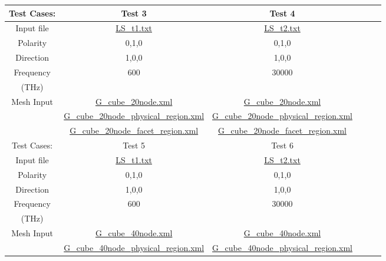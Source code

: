 \documentclass[12pt, titlepage]{article}
\begin{document}
\begin{enumerate}
\begin{table}[h!]
\begin{tabular}{|c|c|c|c|c|c|}
		Test Cases: & Test 3 & Test 4 \\
		\hline 
		Input file & \href{https://github.com/shmouses/SPDFM/tree/master/src/Input/LS_t1.txt}{LS\_t1.txt} & \href{https://github.com/shmouses/SPDFM/tree/master/src/LS_t2.txt}{LS\_t2.txt} \\
		Polarity  & 0,1,0 & 0,1,0 \\
		Direction & 1,0,0 & 1,0,0 \\
		Frequency &   600 & 30000 \\
		(THz) & & \\ \hline
		Mesh Input & \href{https://github.com/shmouses/SPDFM/tree/master/src/Mesh/G_cube_20node.xml}{G\_cube\_20node.xml} & \href{https://github.com/shmouses/SPDFM/tree/master/src/Mesh/G_cube_20node.xml}{G\_cube\_20node.xml} \\
		
		& \href{https://github.com/shmouses/SPDFM/tree/master/src/Mesh/G_cube_20node_physical_region.xml}{G\_cube\_20node\_physical\_region.xml} &
		\href{https://github.com/shmouses/SPDFM/tree/master/src/Mesh/G_cube_20node_physical_region.xml}{G\_cube\_20node\_physical\_region.xml} \\
		
		& \href{https://github.com/shmouses/SPDFM/tree/master/src/Mesh/G_cube_20node_facet_region.xml}{G\_cube\_20node\_facet\_region.xml} &
		\href{https://github.com/shmouses/SPDFM/tree/master/src/Mesh/G_cube_20node_facet_region.xml}{G\_cube\_20node\_facet\_region.xml} \\		
		\hline
		
		Test Cases: & Test 5 & Test 6 \\
		\hline 
		Input file & \href{https://github.com/shmouses/SPDFM/tree/master/src/Input/LS_t1.txt}{LS\_t1.txt} & \href{https://github.com/shmouses/SPDFM/tree/master/src/Input/LS_t2.txt}{LS\_t2.txt} \\
		Polarity  & 0,1,0 & 0,1,0 \\
		Direction & 1,0,0 & 1,0,0 \\
		Frequency &   600 & 30000 \\
		(THz) & & \\ \hline
		Mesh Input & \href{https://github.com/shmouses/SPDFM/tree/master/src/Mesh/G_cube_40node.xml}{G\_cube\_40node.xml} & \href{https://github.com/shmouses/SPDFM/tree/master/src/Mesh/G_cube_40node.xml}{G\_cube\_40node.xml} \\
		
		& \href{https://github.com/shmouses/SPDFM/tree/master/src/Mesh/G_cube_40node_physical_region.xml}{G\_cube\_40node\_physical\_region.xml} &
		\href{https://github.com/shmouses/SPDFM/tree/master/src/Mesh/G_cube_40node_physical_region.xml}{G\_cube\_40node\_physical\_region.xml} \\
		

\end{tabular}
\end{table}
\end{enumerate}
\end{document}
